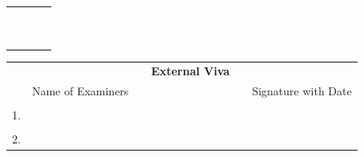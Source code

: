 \ifIDP
\begin{table}[H]
\centering
\begin{tabular}{p{}p{}p{}c}
	&&&\\
	&&&\\
	\centering{\printGuideNameA} \\%
	\centering{Guide} \\%
	& & &\\
	& & & \\
	& & & \\
	\centering{\printDA} &  & \centering{\printPrincipal} &\\
	\centering{Dean Academics} & & \centering{Principal} &\\
	&&&\\
\end{tabular}
\end{table}
\else
\vspace{1cm}
\begin{table}[H]
\centering
{}
\end{table}
\fi

\ifStuNameCUsed \vspace{-0.75cm}\fi
\begin{table}[H]
\centering
\begin{tabular}{lccp{6cm}cc}
	&&&\textbf{\Large External Viva}&&\\
	
	&Name of Examiners &&& & Signature with Date\\
	&&&&&\\
	1.&&&&&\\
	&&&&&\\
	2.&&&&&\\
\end{tabular}
\end{table}